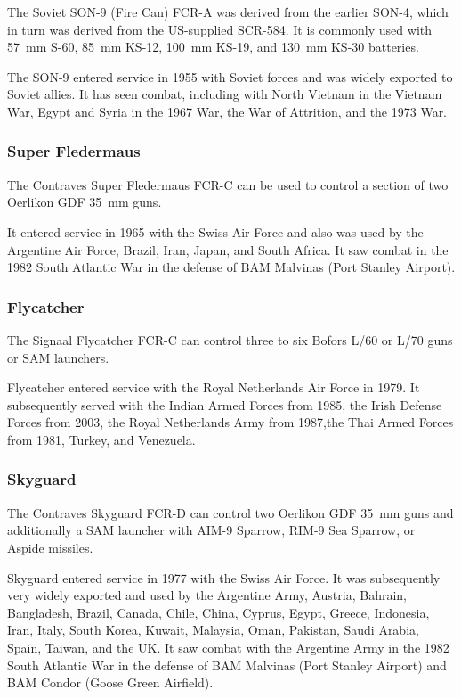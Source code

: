 \documentclass[10pt]{article}
\begin{document}
The Soviet SON-9 (Fire Can) FCR-A was derived from the earlier SON-4, which in turn was derived from the US-supplied SCR-584.
It is commonly used with 57~mm S-60, 85~mm KS-12, 100~mm KS-19, and 130~mm KS-30 batteries.

The SON-9 entered service in 1955 with Soviet forces and was widely exported to Soviet allies.
It has seen combat, including with North Vietnam in the Vietnam War, Egypt and Syria in the 1967 War, the War of Attrition, and the 1973 War.

\subsubsection{Super Fledermaus}

The Contraves Super Fledermaus FCR-C can be used to control a section of two Oerlikon GDF 35~mm guns.

It entered service in 1965 with the Swiss Air Force and also was used by the Argentine Air Force, Brazil, Iran, Japan, and South Africa.
It saw combat in the 1982 South Atlantic War in the defense of BAM Malvinas (Port Stanley Airport).

\subsubsection{Flycatcher}

The Signaal Flycatcher FCR-C can control three to six Bofors L/60 or L/70 guns or SAM launchers.

Flycatcher entered service with the Royal Netherlands Air Force in 1979. It subsequently served with the Indian Armed Forces from 1985, the Irish Defense Forces from 2003, the Royal Netherlands Army from 1987,the Thai Armed Forces from 1981, Turkey, and Venezuela.

\subsubsection{Skyguard}

The Contraves Skyguard FCR-D can control two Oerlikon GDF 35~mm guns and additionally a SAM launcher with AIM-9 Sparrow, RIM-9 Sea Sparrow, or Aspide missiles.

Skyguard entered service in 1977 with the Swiss Air Force.
It was subsequently very widely exported and used by the Argentine Army, Austria, Bahrain, Bangladesh, Brazil, Canada, Chile, China, Cyprus, Egypt, Greece, Indonesia, Iran, Italy, South Korea, Kuwait, Malaysia, Oman, Pakistan, Saudi Arabia, Spain, Taiwan, and the UK.
It saw combat with the Argentine Army in the 1982 South Atlantic War in the defense of BAM Malvinas (Port Stanley Airport) and BAM Condor (Goose Green Airfield).
\end{document}
